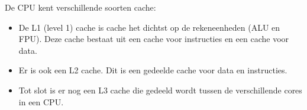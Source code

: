 De CPU kent verschillende soorten cache:
\begin{itemize}
\item De L1 (level 1) cache is cache het dichtst op de rekeneenheden (ALU en FPU). Deze cache bestaat uit een cache voor instructies en een cache voor data.
\item Er is ook een L2 cache. Dit is een gedeelde cache voor data en instructies.
\item Tot slot is er nog een L3 cache die gedeeld wordt tussen de verschillende cores in een CPU.
\end{itemize}

